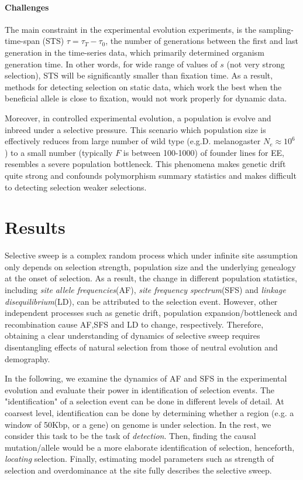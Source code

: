 \documentclass[11pt]{article}
\begin{document}
\paragraph{Challenges}
The main constraint in the experimental evolution experiments, is the 
sampling-time-span (STS) $\tau=\tau_T-\tau_0$, the number of generations 
between the first and last generation in the time-series data, which primarily 
determined organism generation time. In other words, for wide range of values 
of $s$ (not very strong selection), STS will be significantly smaller than 
fixation time. As a result, methods for detecting selection on static data, 
which work the best when the beneficial allele is close to fixation, would not 
work properly for dynamic data.

Moreover, in controlled experimental evolution, a population is evolve and 
inbreed under a selective pressure. This scenario which population size is 
effectively reduces from large number of wild type (e.g.D. melanogaster 
$N_e\approx10^6$ ) to a small number (typically $F$ is between 100-1000) of 
founder lines for EE, resembles a severe population bottleneck. This phenomena 
makes genetic drift quite strong and confounds polymorphism summary statistics 
and makes difficult to detecting selection weaker selections.

\newpage
\section{Results}
Selective sweep is a complex random process which under infinite site assumption
only depends on selection strength,
population size and the underlying genealogy at the onset of 
selection. 
As a result, the change in different population statistics, including 
\emph{site 
allele frequencies}(AF), \emph{site frequency spectrum}(SFS) and \emph{linkage 
disequilibrium}(LD), can be attributed to the selection event.
However, other independent processes such as genetic drift, 
population expansion/bottleneck and recombination cause AF,SFS and LD to 
change, respectively. Therefore, obtaining a clear understanding of dynamics of 
selective sweep  requires disentangling effects of natural selection from 
those of neutral evolution and demography.

 In the following, we examine the dynamics of AF and SFS in the experimental 
 evolution and evaluate their power in identification of selection 
 events. 
 The "identification" of a selection event can be done in 
 different levels of detail. At coarsest level, identification can be done by 
 determining whether a region 
 (e.g. a window of 50Kbp, or a gene) on genome is under selection. In the rest, 
 we consider this task to 
 be the task of \emph{detection}.
 Then, finding the causal 
 mutation/allele would be a more elaborate identification of selection, 
 henceforth, \emph{locating} selection. 
 Finally, estimating model parameters such as strength of selection and 
 overdominance at the site fully describes the selective sweep.
 
\end{document}
